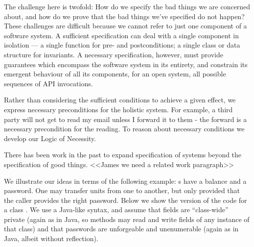 The challenge here is twofold: How do we specify the bad things we are
concerned about, and how do we prove that the bad things we've
specified do not happen?  These challenges are difficult because we
cannot refer to just one component of a software system.  A sufficient
specification can deal with a single component in isolation --- a
single function for pre- and postconditions; a single class or data
structure for invariants. A necessary specification, however, must
provide guarantees which encompass the software system in its
entirety, and constrain its emergent behaviour of all its components,
for an open system, all possible sequences of API invocations.


Rather than considering the sufficient conditions to
achieve a given effect, we express necessary preconditions for the
holistic system. For example, a third party will not get to read my
email unless I forward it to them - the forward is a necessary
precondition for the reading. To reason about necessary conditions we
develop our Logic of Necessity. 

There has been work in the past to expand specification of systems beyond the specification of good things. <<James we need a related work paragraph>>

 




We illustrate our ideas in terms of the following example:
s have a balance and a password. One may transfer
 units from one  to another, but only provided
that the caller provides the right password. Below we show the version
 of the code for a class .  We use a Java-like
syntax, and assume that fields are ``class-wide'' private (again as in
Java, so methods may read and write fields of any instance of that
class) and that passwords are unforgeable and unenumerable (again as
in Java, albeit without reflection).


